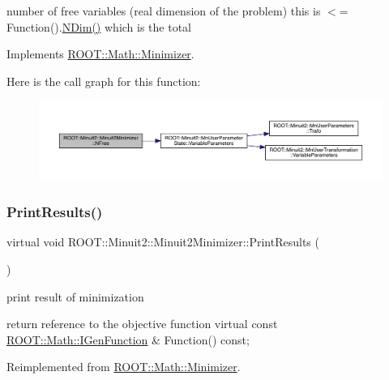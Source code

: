 number of free variables (real dimension of the problem) this is $<$= Function().\mbox{\hyperlink{classROOT_1_1Minuit2_1_1Minuit2Minimizer_a6ed2c7d99296e222f0f43295e302eb9e}{N\+Dim()}} which is the total 

Implements \mbox{\hyperlink{classROOT_1_1Math_1_1Minimizer_a75a7cd8dc0d764ecc9d82dd8f83aab24}{R\+O\+O\+T\+::\+Math\+::\+Minimizer}}.

Here is the call graph for this function\+:
\nopagebreak
\begin{figure}[H]
\begin{center}
\leavevmode
\includegraphics[width=350pt]{d0/d9c/classROOT_1_1Minuit2_1_1Minuit2Minimizer_a0aa136c5a94d1e5c6bfcbfb98da7ad2d_cgraph}
\end{center}
\end{figure}
\mbox{\label{classROOT_1_1Minuit2_1_1Minuit2Minimizer_a0caadc2005eac5d87fc7345bd54decf0}} 
\subsubsection{\texorpdfstring{PrintResults()}{PrintResults()}\hspace{0.1cm}{\footnotesize\ttfamily [1/2]}}
{\footnotesize\ttfamily virtual void R\+O\+O\+T\+::\+Minuit2\+::\+Minuit2\+Minimizer\+::\+Print\+Results (\begin{DoxyParamCaption}{ }\end{DoxyParamCaption})\hspace{0.3cm}{\ttfamily [virtual]}}



print result of minimization 

return reference to the objective function virtual const \mbox{\hyperlink{namespaceROOT_1_1Math_afe6400b4439b79d54c41fb9f5c5af171}{R\+O\+O\+T\+::\+Math\+::\+I\+Gen\+Function}} \& Function() const; 

Reimplemented from \mbox{\hyperlink{classROOT_1_1Math_1_1Minimizer_aea1c5d69c6a1c1f2cf4d17a523862560}{R\+O\+O\+T\+::\+Math\+::\+Minimizer}}.


